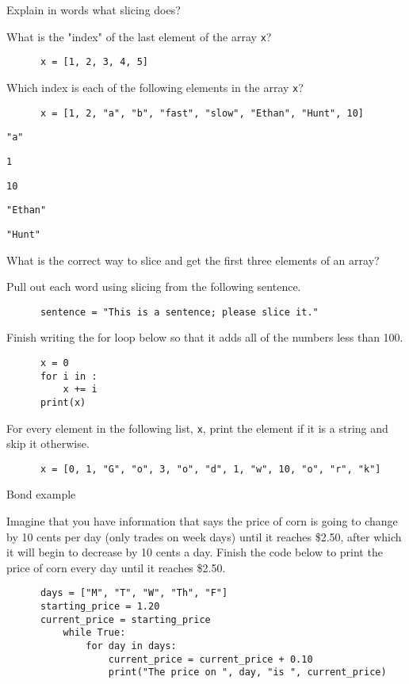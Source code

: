 \documentclass[11pt]{exam}
\begin{document}
\begin{questions}
  \item Explain in words what slicing does?

  \item What is the "index" of the last element of the array \texttt{x}?
    \begin{verbatim}
      x = [1, 2, 3, 4, 5]
    \end{verbatim}

  \item Which index is each of the following elements in the array \texttt{x}?
    \begin{verbatim}
      x = [1, 2, "a", "b", "fast", "slow", "Ethan", "Hunt", 10]
    \end{verbatim}
    \begin{part}
      \item \texttt{"a"}
      \item \texttt{1}
      \item \texttt{10}
      \item \texttt{"Ethan"}
      \item \texttt{"Hunt"}
    \end{part}

  \item What is the correct way to slice and get the first three elements of an array?

  \item Pull out each word using slicing from the following sentence.
    \begin{verbatim}
      sentence = "This is a sentence; please slice it."
    \end{verbatim}

  \item Finish writing the for loop below so that it adds all of the numbers less than 100.
    \begin{verbatim}
      x = 0
      for i in :
          x += i
      print(x)
    \end{verbatim}

  \item For every element in the following list, \texttt{x}, print the element if it is a string and skip it otherwise.
    \begin{verbatim}
      x = [0, 1, "G", "o", 3, "o", "d", 1, "w", 10, "o", "r", "k"]
    \end{verbatim}

  \item Bond example

  \item Imagine that you have information that says the price of corn is going to change by 10 cents per day (only trades on week days) until it reaches \$2.50, after which it will begin to decrease by 10 cents a day. Finish the code below to print the price of corn every day until it reaches \$2.50.
    \begin{verbatim}
      days = ["M", "T", "W", "Th", "F"]
      starting_price = 1.20
      current_price = starting_price
          while True:
              for day in days:
                  current_price = current_price + 0.10
                  print("The price on ", day, "is ", current_price)


\end{verbatim}
\end{questions}
\end{document}

